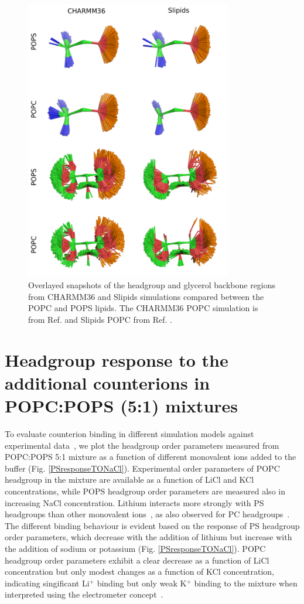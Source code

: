 \documentclass[journal=jpcbfk]{achemso}
\begin{document}
\begin{figure}[]
  \centering
  \includegraphics[width=9.0cm]{../Figs/figS8_POPC.png}
  \caption{\label{HGandGLYstructuresPSPC}
    Overlayed snapshots of the headgroup and glycerol backbone regions 
    from CHARMM36 and Slipids simulations compared between the POPC and POPS lipids.
    The CHARMM36 POPC simulation is from Ref.  and Slipids POPC from Ref. .
  }
\end{figure}




\pagebreak

\section{Headgroup response to the additional counterions in POPC:POPS (5:1) mixtures}\label{mixtureTOadditionalCIs}
To evaluate counterion binding in different simulation models against experimental data~\cite{roux90},
we plot the headgroup order parameters measured from POPC:POPS 5:1 mixture
as a function of different monovalent ions added to the buffer (Fig. \ref{PSresponseTONaCl}). 
Experimental order parameters of POPC headgroup in the mixture are available as a function
of LiCl and KCl concentrations, while POPS headgroup order parameters are measured also
in increasing NaCl concentration. Lithium interacts more strongly with PS headgroups than other monovalent 
ions~\cite{hauser83,hauser85,roux86,mattai89,roux90}, as also observed for PC headgroups~\cite{cevc90}. 
The different binding behaviour is evident based on the response of PS headgroup order parameters, which decrease with the addition of lithium 
but increase with the addition of sodium or potassium (Fig. \ref{PSresponseTONaCl}). 
POPC headgroup order parameters exhibit a clear decrease as a function of LiCl concentration
but only modest changes as a function of KCl concentration, indicating singificant 
Li$^+$ binding but only weak K$^+$ binding to the mixture when interpreted using the
electrometer concept~\cite{akutsu81,altenbach84,seelig87}.
\end{document}

